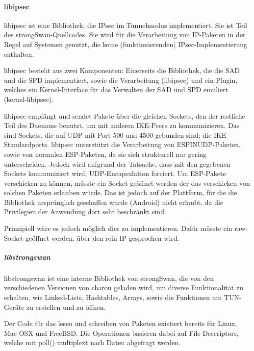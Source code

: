 \paragraph{libipsec}
libipsec ist eine Bibliothek, die IPsec im Tunnelmodus implementiert.
Sie ist Teil des strongSwan-Quellcodes. Sie wird für die Verarbeitung von IP-Paketen
in der Regel auf Systemen genutzt, die keine (funktionierenden) IPsec-Implementierung
enthalten.

libipsec besteht aus zwei Komponenten: Einerseits die Bibliothek, die die SAD und die SPD
implementiert, sowie die Verarbeitung (libipsec) und ein Plugin, welches ein Kernel-Interface
für das Verwalten der \ac{SAD} und \ac{SPD} emuliert (kernel-libipsec).

libipsec empfängt und sendet Pakete über die gleichen Sockets, den der restliche Teil
des Daemons benutzt, um mit anderen IKE-Peers zu kommunizieren. Das sind Sockets,
die auf UDP mit Port 500 und 4500 gebunden sind; die IKE-Standardports.
libipsec unterstützt die Verarbeitung von ESPINUDP-Paketen, sowie von normalen ESP-Paketen,
da sie sich strukturell nur gering unterscheiden. Jedoch wird aufgrund der Tatsache,
dass mit den gegebenen Sockets kommuniziert wird, UDP-Encapsulation forciert.
Um ESP-Pakete verschicken zu können, müsste ein Socket geöffnet werden der das
verschicken von solchen Paketen erlauben würde. Das ist jedoch auf der Plattform,
für die die Bibliothek ursprünglich geschaffen wurde (Android) nicht erlaubt, da
die Privilegien der Anwendung dort sehr beschränkt sind.

Prinzipiell wäre es jedoch möglich dies zu implementieren. Dafür müsste ein
raw-Socket geöffnet werden, über den rein IP gesprochen wird.

\subparagraph{libstrongswan}
libstrongswan ist eine interne Bibliothek von strongSwan, die von den verschiedenen
Versionen von charon geladen wird, um diverse Funktionalität zu erhalten, wie
Linked-Lists, Hashtables, Arrays, sowie die Funktionen um TUN-Geräte zu erstellen und zu öffnen.

Der Code für das lesen und schreiben von Paketen existiert bereits für Linux, Mac OSX
und FreeBSD.
Die Operationen basieren dabei auf File Descriptors, welche mit poll() multiplext nach
Daten abgefragt werden.
